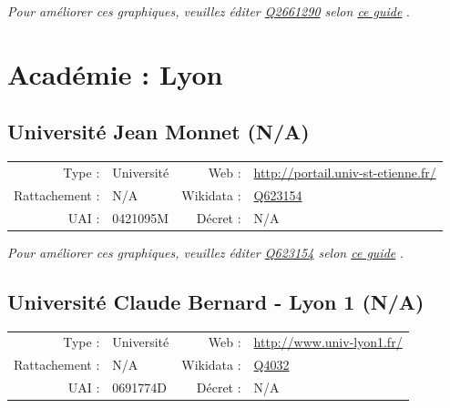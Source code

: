 \documentclass[12pt,french,landscape]{article}
\begin{document}
\textit{\scriptsize Pour améliorer ces graphiques, veuillez éditer \href{https://www.wikidata.org/entity/Q2661290}{Q2661290}  selon \href{https://github.com/cpesr/wikidataESR/blob/master/Rmd/wikidataESR.md}{ce guide}}
.


\newpage

\hypertarget{acaduxe9mie-lyon}{%
\section{Académie : Lyon}\label{acaduxe9mie-lyon}}

\hypertarget{universituxe9-jean-monnet-na}{%
\subsection{Université Jean Monnet
(N/A)}\label{universituxe9-jean-monnet-na}}

\begin{tabular*}{0.45\textwidth}{rp{2cm}rl}  
\hline  
Type : & Université & Web : &\href{http://portail.univ-st-etienne.fr/}{http://portail.univ-st-etienne.fr/} \\  
Rattachement : & N/A & Wikidata : & \href{https://www.wikidata.org/entity/Q623154}{Q623154} \\  
UAI : & 0421095M & Décret : & N/A \\  
\hline  
\end{tabular*}

\textit{\scriptsize Pour améliorer ces graphiques, veuillez éditer \href{https://www.wikidata.org/entity/Q623154}{Q623154}  selon \href{https://github.com/cpesr/wikidataESR/blob/master/Rmd/wikidataESR.md}{ce guide}}
.


\newpage

\hypertarget{universituxe9-claude-bernard---lyon-1-na}{%
\subsection{Université Claude Bernard - Lyon 1
(N/A)}\label{universituxe9-claude-bernard---lyon-1-na}}

\begin{tabular*}{0.45\textwidth}{rp{2cm}rl}  
\hline  
Type : & Université & Web : &\href{http://www.univ-lyon1.fr/}{http://www.univ-lyon1.fr/} \\  
Rattachement : & N/A & Wikidata : & \href{https://www.wikidata.org/entity/Q4032}{Q4032} \\  
UAI : & 0691774D & Décret : & N/A \\  
\hline  
\end{tabular*}
\end{document}
